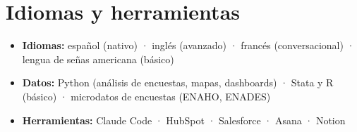 \documentclass[10pt,a4paper]{article}
\begin{document}
\section*{Idiomas y herramientas}
\begin{itemize}
\item \textbf{Idiomas:} español (nativo) · inglés (avanzado) · francés (conversacional) · lengua de señas americana (básico)
\item \textbf{Datos:} Python (análisis de encuestas, mapas, dashboards) · Stata y R (básico) · microdatos de encuestas (ENAHO, ENADES)
\item \textbf{Herramientas:} Claude Code · HubSpot · Salesforce · Asana · Notion
\end{itemize}
\end{document}
